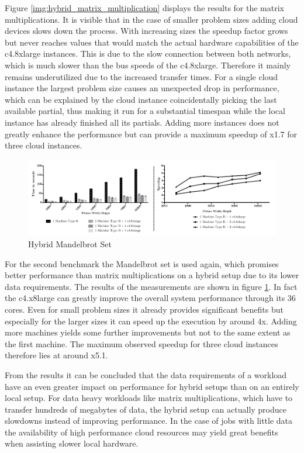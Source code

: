Figure \ref{img:hybrid_matrix_multiplication} displays the results for the matrix multiplications. It is visible that in the case of smaller problem sizes adding cloud devices slows down the process. With increasing sizes the speedup factor grows but never reaches values that would match the actual hardware capabilities of the c4.8xlarge instances. This is due to the slow connection between both networks, which is much slower than the bus speeds of the c4.8xlarge. Therefore it mainly remains underutilized due to the increased transfer times. For a single cloud instance the largest problem size causes an unexpected drop in performance, which can be explained by the cloud instance coincidentally picking the last available partial, thus making it run for a substantial timespan while the local instance has already finished all its partials. Adding more instances does not greatly enhance the performance but can provide a maximum speedup of x1.7 for three cloud instances.


\begin{figure}[H]
	\includegraphics[width=1.0\textwidth]{images/hybrid_mandelbrot_performance.pdf}
	\centering
	\caption{Hybrid Mandelbrot Set}
	\label{img:hybrid_mandelbrot}
\end{figure}

For the second benchmark the Mandelbrot set is used again, which promises better performance than matrix multiplications on a hybrid setup due to its lower data requirements. The results of the measurements are shown in figure \ref{img:hybrid_mandelbrot}. In fact the c4.x8large can greatly improve the overall system performance through its 36 cores. Even for small problem sizes it already provides significant benefits but especially for the larger sizes it can speed up the execution by around 4x. Adding more machines yields some further improvements but not to the same extent as the first machine. The maximum observed speedup for three cloud instances therefore lies at around x5.1.

From the results it can be concluded that the data requirements of a workload have an even greater impact on performance for hybrid setups than on an entirely local setup. For data heavy workloads like matrix multiplications, which have to transfer hundreds of megabytes of data, the hybrid setup can actually produce slowdowns instead of improving performance. In the case of jobs with little data the availability of high performance cloud resources may yield great benefits when assisting slower local hardware.

